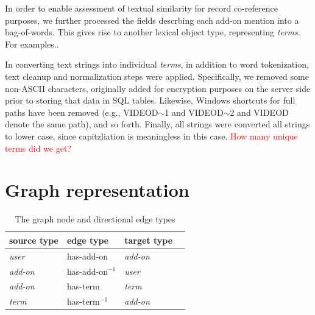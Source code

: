 \documentclass[11pt,oneside]{book}
\let\Oldsection\section
\renewcommand{\section}{\FloatBarrier\Oldsection}
\begin{document}
In order to enable assessment of textual similarity for record co-reference purposes, we further processed the fields descrbing each add-on mention into a bag-of-words. This gives rise to another lexical object type, representing {\it terms}. For examples..

In converting text strings into individual {\it terms}, in addition to word tokenization, text cleanup and normalization steps were applied. Specifically, we removed some non-ASCII characters, originally added for encryption purposes on the server side prior to storing that data in SQL tables. Likewise,  Windows shortcuts for full paths have been removed (e.g., VIDEOD$\sim$1 and VIDEOD$\sim$2 and VIDEOD denote the same path), and so forth. Finally, all strings were converted all strings to lower case, since capitzliation is meaningless in this case. \textcolor{red}{How many unique terms did we get?}


\section{Graph representation}

\begin{table}[t]
\begin{center}
\begin{small}
\begin{tabular}{llll}
\hline 
\textbf{source type} & \textbf{edge type} & \textbf{target type} \\
\hline
{\it user} & has-add-on & {\it add-on} \\
\hline
{\it add-on} &  has-add-on$^{-1}$ & {\it user} \\
{\it add-on} & has-term & {\it term} \\
\hline
{\it term} & has-term$^{-1}$ & {\it add-on} \\
\hline
\end{tabular}
\end{small}
\end{center}
\caption{\label{tab:graph_structure} The graph node and directional edge types}
\end{table}
\end{document}
